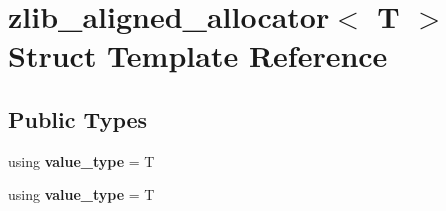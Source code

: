 \hypertarget{structzlib__aligned__allocator}{\section{zlib\-\_\-aligned\-\_\-allocator$<$ T $>$ Struct Template Reference}
\label{structzlib__aligned__allocator}
}
\subsection*{Public Types}
\begin{DoxyCompactItemize}
\item 
\hypertarget{structzlib__aligned__allocator_adfcc99fcd81e0b0c4dbd26ea51cb9986}{using {\bfseries value\-\_\-type} = T}\label{structzlib__aligned__allocator_adfcc99fcd81e0b0c4dbd26ea51cb9986}

\item 
\hypertarget{structzlib__aligned__allocator_adfcc99fcd81e0b0c4dbd26ea51cb9986}{using {\bfseries value\-\_\-type} = T}\label{structzlib__aligned__allocator_adfcc99fcd81e0b0c4dbd26ea51cb9986}

\end{DoxyCompactItemize}
